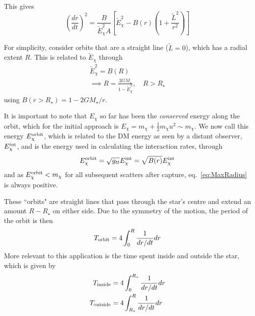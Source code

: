 This gives
\begin{equation}
    \left (\frac{dr}{dt} \right)^2 = \frac{B}{\tilde E_\chi^2 A} \left[\tilde E_\chi^2- B(r) \left(  1 + \frac{\tilde L^2}{r^2} \right) \right]\label{eq:drdt2GR}
\end{equation}


For simplicity, consider orbits that are a straight line ($\tilde L = 0$), which has a radial extent $R$. This is related to $\tilde E_\chi$ through
\begin{gather}
    \tilde E_\chi^2 = B(R)\label{eq:maxradgeneral}\\
    \implies R = \frac{2 G M_\star}{1 - \tilde E_\chi^2}, \quad R>R_\star
    \label{eq:MaxRadius}
\end{gather}
using $B(r>R_\star) = 1 - 2 G M_\star /r$.

It is important to note that $E_\chi$ so far has been the \textit{conserved} energy along the orbit, 
which for the initial approach is $E_\chi = m_\chi + \frac{1}{2}m_\chi u^2\sim m_\chi$. 
We now call this energy $E_\chi^{\rm orbit}$, which is related to the DM energy as seen by a distant observer, $E_\chi^{\rm int}$, 
and is the energy used in calculating the interaction rates, through 
\begin{equation}
    E_\chi^{\rm orbit} = \sqrt{g_{tt}} E_\chi^{\rm int} = \sqrt{B(r)}E_\chi^{\rm int}
\end{equation}
and as $E_\chi^{\rm orbit} < m_\chi$ for all subsequent scatters after capture, eq.~\ref{eq:MaxRadius} is always positive.

These ``orbits" are straight lines that pass through the star's centre and extend an amount $R - R_\star$ on either side. 
Due to the symmetry of the motion, the period of the orbit is then
\begin{equation}
    T_{\rm orbit} = 4 \int_0^R \frac{1}{dr/dt}dr
\end{equation}
More relevant to this application is the time spent inside and outside the star, which is given by
\begin{align}
    T_{\rm inside} & = 4 \int_0^{R_\star} \frac{1}{dr/dt}dr\label{eq:timeinside}\\
    T_{\rm outside} & = 4 \int_{R_\star}^R \frac{1}{dr/dt}dr\label{eq:timeoutside}
\end{align}

